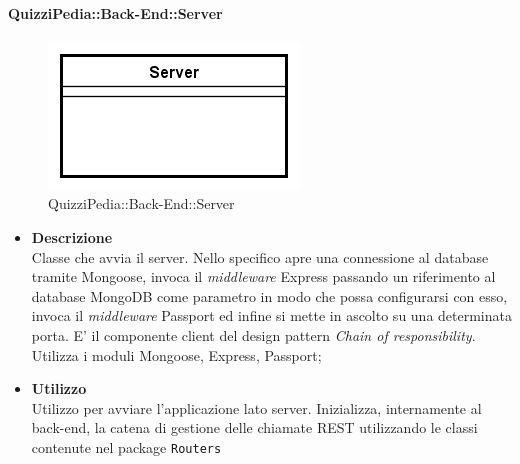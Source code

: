 	\paragraph{QuizziPedia::Back-End::Server}
\label{QuizziPedia::Back-End::Server}
\begin{figure}[ht]
	\centering
	\includegraphics[scale=0.45]{UML/Classi/Back-End/QuizziPedia_Back-End_Server.png}
	\caption{QuizziPedia::Back-End::Server}
\end{figure}
\FloatBarrier
	\begin{itemize}
		\item \textbf{Descrizione} \\
		Classe che avvia il server. Nello specifico apre una connessione al database tramite Mongoose, invoca il \textit{middleware} Express passando un riferimento al database MongoDB come parametro in modo  che possa configurarsi con esso, invoca il \textit{middleware} Passport ed infine si mette in ascolto su una determinata porta. E' il componente client del design pattern \textit{Chain of responsibility}. Utilizza i moduli Mongoose, Express, Passport;
		\item \textbf{Utilizzo} \\
		Utilizzo per avviare l'applicazione lato server. Inizializza, internamente al back-end, la catena di gestione delle chiamate REST utilizzando le classi contenute nel package \texttt{Routers}
	\end{itemize}
	